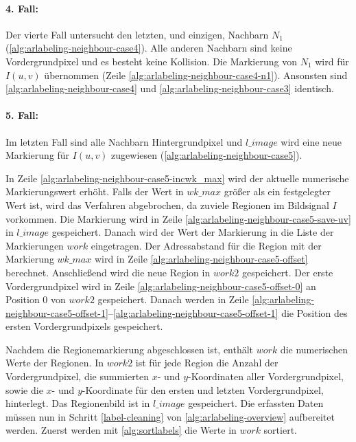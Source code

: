 \paragraph{4. Fall:} %
\label{par:fall_4_}
Der vierte Fall untersucht den letzten, und einzigen, Nachbarn $N_1$ (\autoref{alg:arlabeling-neighbour-case4}). Alle
 anderen Nachbarn sind keine Vordergrundpixel und es besteht keine Kollision. Die Markierung von $N_1$ wird für
 $I(u,v)$ übernommen (Zeile \ref{alg:arlabeling-neighbour-case4-n1}). Ansonsten sind
 \autoref{alg:arlabeling-neighbour-case4} und \autoref{alg:arlabeling-neighbour-case3} identisch.




\paragraph{5. Fall:} %
\label{par:fall_5_}
Im letzten Fall sind alle Nachbarn Hintergrundpixel und $\mathit{l\_image}$ wird eine neue Markierung für $I(u,v)$
 zugewiesen (\autoref{alg:arlabeling-neighbour-case5}).



In Zeile \ref{alg:arlabeling-neighbour-case5-incwk_max} wird der aktuelle numerische Markierungswert erhöht. Falls der
 Wert in $\mathit{wk\_max}$ größer als ein festgelegter Wert ist, wird das Verfahren abgebrochen, da zuviele Regionen
 im Bildsignal $I$ vorkommen. Die Markierung wird in Zeile \ref{alg:arlabeling-neighbour-case5-save-uv} in
 $\mathit{l\_image}$ gespeichert. Danach wird der Wert der Markierung in die Liste der Markierungen $\mathit{work}$
 eingetragen. Der Adressabstand für die Region mit der Markierung $\mathit{wk\_max}$ wird in Zeile
 \ref{alg:arlabeling-neighbour-case5-offset} berechnet. Anschließend wird die neue Region in $\mathit{work2}$
 gespeichert. Der erste Vordergrundpixel wird in Zeile \ref{alg:arlabeling-neighbour-case5-offset-0} an Position $0$
 von $\mathit{work2}$ gespeichert. Danach werden in Zeile
 \ref{alg:arlabeling-neighbour-case5-offset-1}--\ref{alg:arlabeling-neighbour-case5-offset-1} die Position des ersten
 Vordergrundpixels gespeichert.


Nachdem die Regionemarkierung abgeschlossen ist, enthält $\mathit{work}$ die numerischen Werte der Regionen. In
 $\mathit{work2}$ ist für jede Region die Anzahl der Vordergrundpixel, die summierten $x$- und $y$-Koordinaten aller
 Vordergrundpixel, sowie die $x$- und $y$-Koordinate für den ersten und letzten Vordergrundpixel, hinterlegt. Das
 Regionenbild ist in $\mathit{l\_image}$ gespeichert. Die erfassten Daten müssen nun in Schritt \ref{label-cleaning} von
 \autoref{alg:arlabeling-overview} aufbereitet werden. Zuerst werden mit \autoref{alg:sortlabels} die Werte
 in $\mathit{work}$ sortiert.


